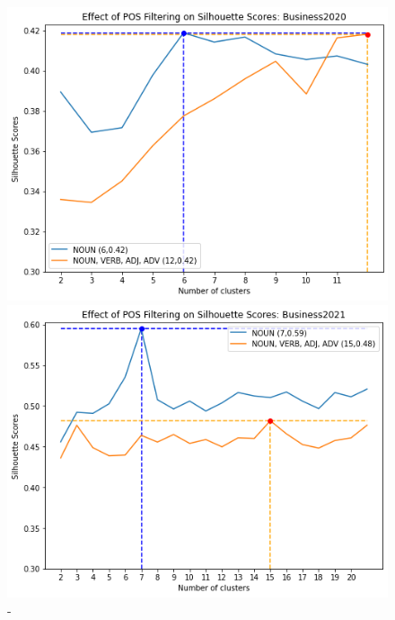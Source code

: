 \begin{figure}[H]
\centering
  \begin{minipage}[t]{.49\linewidth}
    \centering
    \includegraphics[width=\linewidth]{images/eval/business2020_sil.png}
    \caption{-}
    \label{fig:pos_business2020}
  \end{minipage}
  \begin{minipage}[t]{.49\textwidth}
    \centering
    \includegraphics[width=\linewidth]{images/eval/business2021_sil.png}
    \caption{-}
    \label{fig:pos_business2021}
  \end{minipage}
  \begin{minipage}[t]{.49\textwidth}
    \centering

\end{minipage}
\end{figure}
